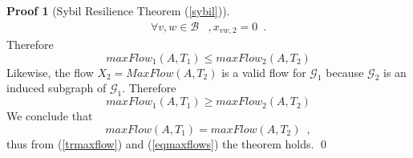 \documentclass[11pt]{llncs}
\theoremstyle{definition}
\newtheorem{sepproof}{Proof}
\begin{document}
\begin{sepproof}[Sybil Resilience Theorem (\ref{sybil})]
\begin{align*}
          \forall v,w \in \mathcal{B}&, x_{vw,2} = 0 \enspace.
       \end{align*}
       Therefore
       \begin{equation*}
          maxFlow_1\left(A, T_1\right) \leq maxFlow_2\left(A, T_2\right)
       \end{equation*}
       Likewise, the flow $X_2 = MaxFlow(A, T_2)$ is a valid flow for $\mathcal{G}_1$ because $\mathcal{G}_2$ is an induced
       subgraph of $\mathcal{G}_1$. Therefore
       \begin{equation*}
          maxFlow_1\left(A, T_1\right) \geq maxFlow_2\left(A, T_2\right)
       \end{equation*}
       We conclude that
       \begin{equation}
       \label{eqmaxflows}
          maxFlow\left(A, T_1\right) = maxFlow\left(A, T_2\right) \enspace,
       \end{equation}
       thus from (\ref{trmaxflow}) and (\ref{eqmaxflows}) the theorem holds.
       \qed
    \end{sepproof}
\end{document}
